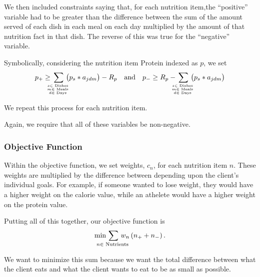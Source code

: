 \documentclass[twoside]{article}
\begin{document}
We then included constraints saying that, for each nutrition item,the ``positive'' variable had to be greater than the difference between the sum of the amount served of each dish in each meal on each day multiplied by the amount of that nutrition fact in that dish. The reverse of this was true for the ``negative'' variable.

Symbolically, considering the nutrition item Protein indexed as $p$, we set
\begin{equation*}
    p_+ \geq \thinspace\smashoperator{\sum_{s \in \text{ Dishes } \atop {m \in \text{ Meals } \atop d \in \text{ Days }}}}\thinspace\del{p_s * a_{jdm}} - R_p \quad \text{and} \quad
    p_- \geq  R_p - \thinspace\smashoperator{\sum_{s \in \text{ Dishes } \atop {m \in \text{ Meals } \atop d \in \text{ Days }}}}\thinspace \del{p_s * a_{jdm}}
\end{equation*}

We repeat this process for each nutrition item.

Again, we require that all of these variables be non-negative.

\subsubsection{Objective Function}
Within the objective function, we set weights, $c_n$, for each nutrition item $n$. These weights are multiplied by the difference between depending upon the client's individual goals. For example, if someone wanted to lose weight, they would have a higher weight on the calorie value, while an athelete would have a higher weight on the protein value.

Putting all of this together, our objective function is
\begin{equation*}
    \min\thinspace \smashoperator{\sum_{n \in \text{ Nutrients }}}\thinspace w_n \del{n_+ + n_-}.
\end{equation*}

We want to minimize this sum because we want the total difference between what the client eats and what the client wants to eat to be as small as possible.
\end{document}
